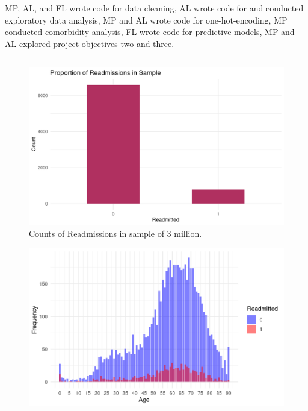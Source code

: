\documentclass[sn-basic,pdflatex]{sn-jnl}
\theoremstyle{remark}
\theoremstyle{definition}
\begin{document}

MP, AL, and FL wrote code for data cleaning, AL wrote code for and
conducted exploratory data analysis, MP and AL wrote code for
one-hot-encoding, MP conducted comorbidity analysis, FL wrote code for
predictive models, MP and AL explored project objectives two and three.

\begin{appendices}

\hypertarget{secA}{%
\section{}\label{secA}}

\begin{figure}[H]

{\centering \includegraphics[width=1\linewidth]{figures/CIB} 

}

\caption{ Counts of Readmissions in sample of 3 million.}\label{fig:CIB}
\end{figure}
\begin{figure}[H]

{\centering \includegraphics[width=1\linewidth]{figures/AGE} 

}
\end{figure}
\end{appendices}
\end{document}
